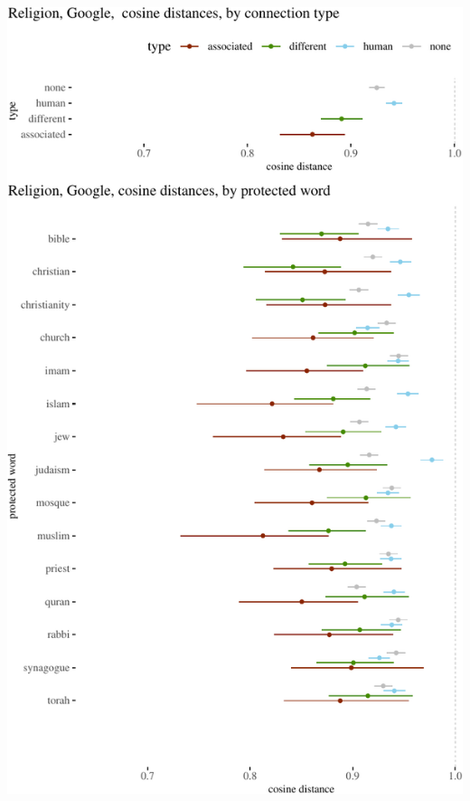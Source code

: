 \documentclass{clv3}
\begin{document}
\begin{center}\includegraphics[width=1\linewidth]{figures/resultsReligionGooglea} \end{center}
\end{document}
